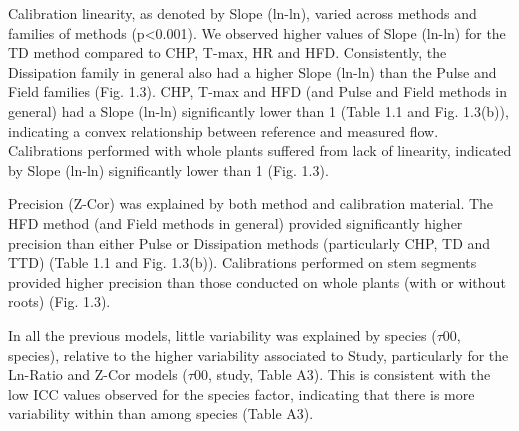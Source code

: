 \documentclass[11pt,twoside]{reedthesis}
\begin{document}
Calibration linearity, as denoted by Slope (ln-ln), varied across
methods and families of methods (p\textless{}0.001). We observed higher
values of Slope (ln-ln) for the TD method compared to CHP, T-max, HR and
HFD. Consistently, the Dissipation family in general also had a higher
Slope (ln-ln) than the Pulse and Field families (Fig. 1.3). CHP, T-max
and HFD (and Pulse and Field methods in general) had a Slope (ln-ln)
significantly lower than 1 (Table 1.1 and Fig. 1.3(b)), indicating a
convex relationship between reference and measured flow. Calibrations
performed with whole plants suffered from lack of linearity, indicated
by Slope (ln-ln) significantly lower than 1 (Fig. 1.3).\par

Precision (Z-Cor) was explained by both method and calibration material.
The HFD method (and Field methods in general) provided significantly
higher precision than either Pulse or Dissipation methods (particularly
CHP, TD and TTD) (Table 1.1 and Fig. 1.3(b)). Calibrations performed on
stem segments provided higher precision than those conducted on whole
plants (with or without roots) (Fig. 1.3).\par

In all the previous models, little variability was explained by species
(\(\tau 00\), species), relative to the higher variability associated to
Study, particularly for the Ln-Ratio and Z-Cor models (\(\tau 00\),
study, Table A3). This is consistent with the low ICC values observed
for the species factor, indicating that there is more variability within
than among species (Table A3).\par
\end{document}
